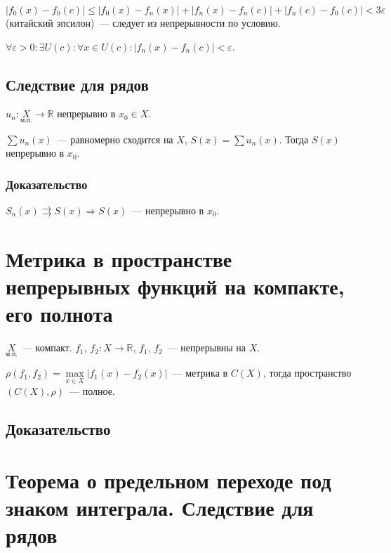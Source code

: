 \documentclass{article}
\begin{document}
            $| f_0(x) - f_0(c) | \leqslant | f_0(x) - f_n(x) | + | f_n(x) - f_n(c) | + | f_n(c) - f_0(c) | < 3 \varepsilon$ (китайский эпсилон)~--- следует из непрерывности по условию.
            
            $\forall \varepsilon > 0 : \exists U(c) : \forall x \in U(c) : | f_n(x) - f_n(c) | < \varepsilon$.
            
        \subsection{Следствие для рядов}
        
            $u_n : \underset{\text{м.п.}}{X} \rightarrow \mathbb{R}$ непрерывно в $x_0 \in X$.
            
            $\sum u_n(x)$~--- равномерно сходится на $X$, $S(x) = \sum u_n(x)$. Тогда $S(x)$ непрерывно в $x_0$.
            
            \subsubsection{Доказательство}
        
                $S_n(x) \rightrightarrows S(x) \Rightarrow S(x)$~--- непрерывно в $x_0$.
            
    \newpage
    
    \section{Метрика в пространстве непрерывных функций на компакте, его полнота}
    
        $\underset{\text{м.п.}}{X}$~--- компакт. $f_1$, $f_2 : X \rightarrow \mathbb{R}$, $f_1$, $f_2$~--- непрерывны на $X$.
        
        $\rho(f_1, f_2) = \max\limits_{x \in X} | f_1(x) - f_2(x) |$~--- метрика в $C(X)$, тогда пространство $(C(X), \rho)$~--- полное.
        
        \subsection{Доказательство}
        
                        
    \newpage
    
    \section{Теорема о предельном переходе под знаком интеграла. Следствие для рядов}
    
\end{document}

